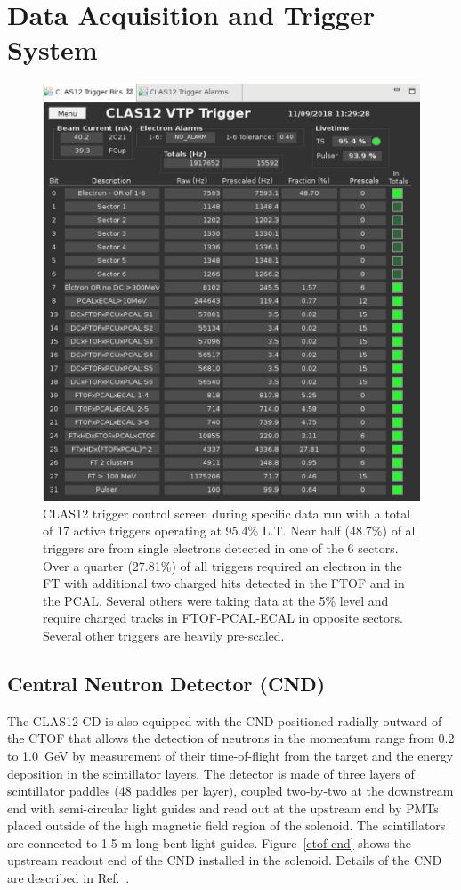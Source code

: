 \documentclass[final,3p,twocolumn]{elsarticle}
\begin{document}
\section{Data Acquisition and Trigger System} 
\begin{figure}[t!]
\centerline{\includegraphics[width=0.95\columnwidth]{CLAS12-triggers.png}}
\caption{CLAS12 trigger control screen during specific data run with a total of 17 active triggers operating at 95.4\% L.T.  
Near half (48.7\%) of all
triggers are from single electrons detected in one of the 6 sectors. Over a quarter (27.81\%) of all triggers required an electron in 
the FT with additional two charged hits detected in the FTOF and in the PCAL. Several others were taking data at the 5\% level and require charged tracks in FTOF-PCAL-ECAL in opposite sectors. Several other triggers are heavily pre-scaled. }
\label{CLAS12-triggers}
\end{figure}
\subsection{Central Neutron Detector (CND)}

The CLAS12 CD is also equipped with the CND positioned radially outward of the CTOF that allows the detection
of neutrons in the momentum range from 0.2 to 1.0~GeV by measurement of their time-of-flight from the target
and the energy deposition in the scintillator layers. The detector is made of three layers of scintillator paddles
(48 paddles per layer), coupled two-by-two at the downstream end with semi-circular light guides and read out at
the upstream end by PMTs placed outside of the high magnetic field region of the solenoid. The scintillators are
connected to 1.5-m-long bent light guides. Figure~\ref{ctof-cnd} shows the upstream readout end of the
CND installed in the solenoid. Details of the CND are described in Ref.~\cite{cnd-nim}.
\end{document}

